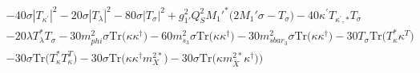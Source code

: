 {\begin{align}
 &-40 \sigma |T_{\kappa^\prime}|^2 -20 \sigma |T_{\lambda}|^2 -80 \sigma |T_{\sigma}|^2 +g_{1'}^{2} Q_{S}^{2} M_1'^* \Big(2 M_1' \sigma  - T_{\sigma} \Big)-40 \kappa^\prime T_{\kappa^{\prime},*} T_{\sigma} \nonumber \\ 
 &-20 \lambda T_{\lambda}^* T_{\sigma} -30 m_{phi}^2 \sigma \mbox{Tr}\Big({\kappa  \kappa^{\dagger}}\Big) -60 m_{s_3}^2 \sigma \mbox{Tr}\Big({\kappa  \kappa^{\dagger}}\Big) -30 m_{sbar_3}^2 \sigma \mbox{Tr}\Big({\kappa  \kappa^{\dagger}}\Big) -30 T_{\sigma} \mbox{Tr}\Big({T_{\kappa}^*  \kappa^{T}}\Big) \nonumber \\ 
 &-30 \sigma \mbox{Tr}\Big({T_{\kappa}^*  T_{\kappa}^{T}}\Big) -30 \sigma \mbox{Tr}\Big({\kappa  \kappa^{\dagger}  m_{X}^{2 *}}\Big) -30 \sigma \mbox{Tr}\Big({\kappa  m_{\bar{X}}^{2 *}  \kappa^{\dagger}}\Big) \Big)
\end{align}} 
